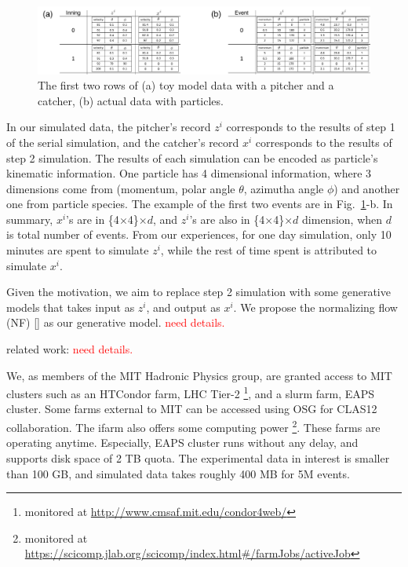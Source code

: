 \documentclass{article}
\begin{document}
\begin{figure}[!hb]
 \centering
   \includegraphics[width=\linewidth]{dataDescription.pdf}
  \caption{The first two rows of (a) toy model data with a pitcher and a catcher, (b) actual data with particles.}
  \label{data}
\end{figure}

\quad In our simulated data, the pitcher's record $z^i$ corresponds to the results of step 1 of the serial simulation, and the catcher's record $x^i$ corresponds to the results of step 2 simulation. The results of each simulation can be encoded as particle's kinematic information. One particle has 4 dimensional information, where 3 dimensions come from (momentum, polar angle $\theta$, azimutha angle $\phi$) and another one from particle species. The example of the first two events are in Fig.~\ref{data}-b. In summary, $x^i$'s are in \{4$\times$4\}$\times d$, and $z^i$'s are also in \{4$\times$4\}$\times d$ dimension, when $d$ is total number of events. From our experiences, for one day simulation, only 10 minutes are spent to simulate $z^i$, while the rest of time spent is attributed to simulate $x^i$.

\quad Given the motivation, we aim to replace step 2 simulation with some generative models that takes input as $z^i$, and output as $x^i$. We propose the normalizing flow (NF) [\citet{9089305, papamakarios2019normalizing}] as our generative model. \textcolor{red}{need details.}

related work: \citet{PhysRevD.101.076002}\textcolor{red}{need details.}



\quad We, as members of the MIT Hadronic Physics group, are granted access to MIT clusters such as an HTCondor farm, LHC Tier-2 \footnote{monitored at \url{http://www.cmsaf.mit.edu/condor4web/}}, and a slurm farm, EAPS cluster. Some farms external to MIT can be accessed using OSG for CLAS12 collaboration. The ifarm also offers some computing power \footnote{monitored at \url{https://scicomp.jlab.org/scicomp/index.html\#/farmJobs/activeJob}}. These farms are operating anytime. Especially, EAPS cluster runs without any delay, and supports disk space of 2 TB quota. The experimental data in interest is smaller than 100 GB, and simulated data takes roughly 400 MB for 5M events.
\end{document}
